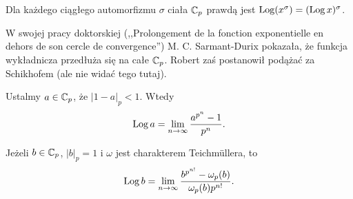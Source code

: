 \begin{fakt}
	Dla każdego ciągłego automorfizmu $\sigma$ ciała $\mathbb C_p$ prawdą jest $\operatorname{Log}(x^\sigma) = (\operatorname{Log} x)^\sigma$.
\end{fakt}

W swojej pracy doktorskiej (,,Prolongement de la fonction exponentielle en dehors de son cercle de convergence'') M. C. Sarmant-Durix pokazała, że funkcja wykładnicza przedłuża się na całe $\mathbb C_p$.
Robert zaś postanowił podążać za Schikhofem (ale nie widać tego tutaj).

\begin{fakt}
	Ustalmy $a \in \mathbb C_p$, że $|1 - a|_p <1$.
	Wtedy
	\[
		\operatorname{Log} a = \lim_{n \to \infty}\frac{a^{p^n} - 1}{p^n}.
	\]

	Jeżeli $b \in \mathbb C_p$, $|b|_p = 1$ i $\omega$ jest charakterem Teichmüllera, to
	\[
		\operatorname{Log} b = \lim_{n \to \infty}\frac{b^{p^{n!}} - \omega_p(b)}{\omega_p(b) p^{n!}}.
	\]

\end{fakt}

\color{black}